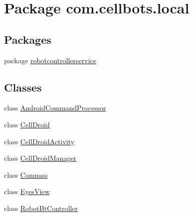 \hypertarget{namespacecom_1_1cellbots_1_1local}{\section{Package com.\-cellbots.\-local}
\label{namespacecom_1_1cellbots_1_1local}
}
\subsection*{Packages}
\begin{DoxyCompactItemize}
\item 
package \hyperlink{namespacecom_1_1cellbots_1_1local_1_1robotcontrollerservice}{robotcontrollerservice}
\end{DoxyCompactItemize}
\subsection*{Classes}
\begin{DoxyCompactItemize}
\item 
class \hyperlink{classcom_1_1cellbots_1_1local_1_1_android_command_processor}{Android\-Command\-Processor}
\item 
class \hyperlink{classcom_1_1cellbots_1_1local_1_1_cell_droid}{Cell\-Droid}
\item 
class \hyperlink{classcom_1_1cellbots_1_1local_1_1_cell_droid_activity}{Cell\-Droid\-Activity}
\item 
class \hyperlink{classcom_1_1cellbots_1_1local_1_1_cell_droid_manager}{Cell\-Droid\-Manager}
\item 
class \hyperlink{classcom_1_1cellbots_1_1local_1_1_compass}{Compass}
\item 
class \hyperlink{classcom_1_1cellbots_1_1local_1_1_eyes_view}{Eyes\-View}
\item 
class \hyperlink{classcom_1_1cellbots_1_1local_1_1_robot_bt_controller}{Robot\-Bt\-Controller}
\end{DoxyCompactItemize}

